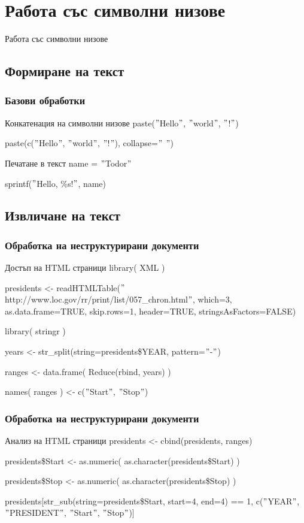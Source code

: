 \documentclass{beamer}
\begin{document}
\section{Работа със символни низове}

\begin{frame}
\center \huge{Работа със символни низове}
\end{frame}

\subsection{Формиране на текст}

\begin{frame}
\frametitle{Базови обработки}
\begin{block}{Конкатенация на символни низове}
paste($"$Hello$"$, $"$world$"$, $"$!$"$)

paste(c($"$Hello$"$, $"$world$"$, $"$!$"$), collapse=$"$ $"$)
\end{block}

\begin{block}{Печатане в текст}
name = $"$Todor$"$

sprintf($"$Hello, \%s!$"$, name)
\end{block}
\end{frame}

\subsection{Извличане на текст}

\begin{frame}
\frametitle{Обработка на неструктурирани документи}
\begin{block}{Достъп на HTML страници}
library( XML )

presidents <- readHTMLTable($"$http://www.loc.gov/rr/print/list/057\_chron.html$"$, which=3, as.data.frame=TRUE, skip.rows=1, header=TRUE, stringsAsFactors=FALSE)

library( stringr )

years <- str\_split(string=presidents\$YEAR, pattern=$"$-$"$)

ranges <- data.frame( Reduce(rbind, years) )

names( ranges ) <- c($"$Start$"$, $"$Stop$"$)
\end{block}
\end{frame}

\begin{frame}
\frametitle{Обработка на неструктурирани документи}
\begin{block}{Анализ на HTML страници}
presidents <- cbind(presidents, ranges)

presidents\$Start <- as.numeric( as.character(presidents\$Start) )

presidents\$Stop <- as.numeric( as.character(presidents\$Stop) )

presidents[str\_sub(string=presidents\$Start, start=4, end=4) == 1, c($"$YEAR$"$, $"$PRESIDENT$"$, $"$Start$"$, $"$Stop$"$)]
\end{block}
\end{frame}
\end{document}

